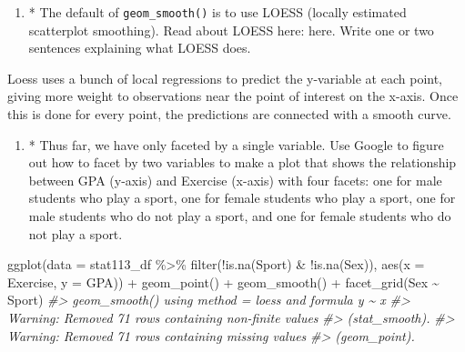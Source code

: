\documentclass[
]{book}
\newenvironment{Shaded}{\begin{snugshade}}{\end{snugshade}}
\newcommand{\AttributeTok}[1]{\textcolor[rgb]{0.77,0.63,0.00}{#1}}
\newcommand{\CommentTok}[1]{\textcolor[rgb]{0.56,0.35,0.01}{\textit{#1}}}
\newcommand{\FunctionTok}[1]{\textcolor[rgb]{0.00,0.00,0.00}{#1}}
\newcommand{\NormalTok}[1]{#1}
\newcommand{\SpecialCharTok}[1]{\textcolor[rgb]{0.00,0.00,0.00}{#1}}
\providecommand{\tightlist}{%
  \setlength{\itemsep}{0pt}\setlength{\parskip}{0pt}}
\begin{document}
\begin{enumerate}
\def\labelenumi{\arabic{enumi}.}
\tightlist
\item
  * The default of \texttt{geom\_smooth()} is to use LOESS (locally estimated scatterplot smoothing). Read about LOESS here: here. Write one or two sentences explaining what LOESS does.
\end{enumerate}

Loess uses a bunch of local regressions to predict the y-variable at each point, giving more weight to observations near the point of interest on the x-axis. Once this is done for every point, the predictions are connected with a smooth curve.

\begin{enumerate}
\def\labelenumi{\arabic{enumi}.}
\setcounter{enumi}{1}
\tightlist
\item
  * Thus far, we have only faceted by a single variable. Use Google to figure out how to facet by two variables to make a plot that shows the relationship between GPA (y-axis) and Exercise (x-axis) with four facets: one for male students who play a sport, one for female students who play a sport, one for male students who do not play a sport, and one for female students who do not play a sport.
\end{enumerate}

\begin{Shaded}
\begin{Highlighting}[]
\FunctionTok{ggplot}\NormalTok{(}\AttributeTok{data =}\NormalTok{ stat113\_df }\SpecialCharTok{\%\textgreater{}\%} \FunctionTok{filter}\NormalTok{(}\SpecialCharTok{!}\FunctionTok{is.na}\NormalTok{(Sport) }\SpecialCharTok{\&} \SpecialCharTok{!}\FunctionTok{is.na}\NormalTok{(Sex)),}
  \FunctionTok{aes}\NormalTok{(}\AttributeTok{x =}\NormalTok{ Exercise, }\AttributeTok{y =}\NormalTok{ GPA)) }\SpecialCharTok{+} 
  \FunctionTok{geom\_point}\NormalTok{() }\SpecialCharTok{+} \FunctionTok{geom\_smooth}\NormalTok{() }\SpecialCharTok{+}
  \FunctionTok{facet\_grid}\NormalTok{(Sex }\SpecialCharTok{\textasciitilde{}}\NormalTok{ Sport)}
\CommentTok{\#\textgreater{} \textasciigrave{}geom\_smooth()\textasciigrave{} using method = \textquotesingle{}loess\textquotesingle{} and formula \textquotesingle{}y \textasciitilde{} x\textquotesingle{}}
\CommentTok{\#\textgreater{} Warning: Removed 71 rows containing non{-}finite values}
\CommentTok{\#\textgreater{} (stat\_smooth).}
\CommentTok{\#\textgreater{} Warning: Removed 71 rows containing missing values}
\CommentTok{\#\textgreater{} (geom\_point).}
\end{Highlighting}
\end{Shaded}
\end{document}
